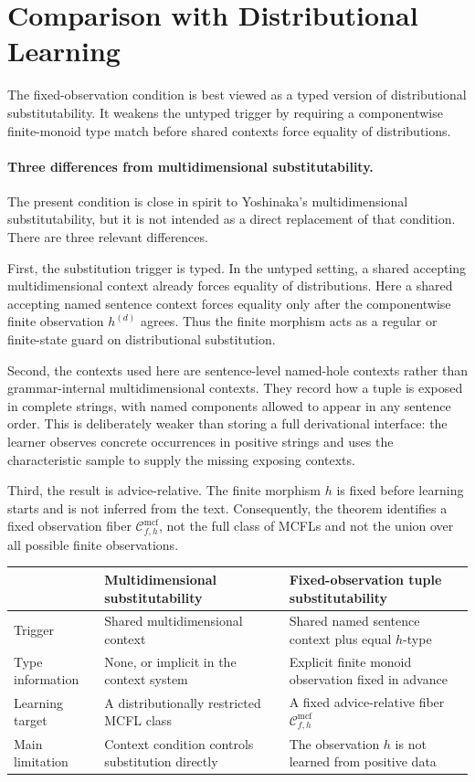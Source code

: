 \documentclass[11pt,a4paper]{article}
\theoremstyle{remark}
\newcommand{\Cmcf}[2]{\mathcal{C}^{\mathrm{mcf}}_{#1,#2}}
\begin{document}
\section{Comparison with Distributional Learning}
\label{sec:comparison}

The fixed-observation condition is best viewed as a typed version of
distributional substitutability.  It weakens the untyped trigger by requiring a
componentwise finite-monoid type match before shared contexts force equality of
distributions.

\paragraph{Three differences from multidimensional substitutability.}
The present condition is close in spirit to Yoshinaka's multidimensional
substitutability, but it is not intended as a direct replacement of that
condition.  There are three relevant differences.

First, the substitution trigger is typed.  In the untyped setting, a shared
accepting multidimensional context already forces equality of distributions.
Here a shared accepting named sentence context forces equality only after the
componentwise finite observation \(h^{(d)}\) agrees.  Thus the finite morphism
acts as a regular or finite-state guard on distributional substitution.

Second, the contexts used here are sentence-level named-hole contexts rather
than grammar-internal multidimensional contexts.  They record how a tuple is
exposed in complete strings, with named components allowed to appear in any
sentence order.  This is deliberately weaker than storing a full derivational
interface: the learner observes concrete occurrences in positive strings and
uses the characteristic sample to supply the missing exposing contexts.

Third, the result is advice-relative.  The finite morphism \(h\) is fixed before
learning starts and is not inferred from the text.  Consequently, the theorem
identifies a fixed observation fiber \(\Cmcf{f}{h}\), not the full class of
MCFLs and not the union over all possible finite observations.

\begin{center}
\begin{tabular}{|p{}|p{}|p{}|}
\hline
 & Multidimensional substitutability & Fixed-observation tuple substitutability \\
\hline
Trigger & Shared multidimensional context & Shared named sentence context plus equal \(h\)-type \\
\hline
Type information & None, or implicit in the context system & Explicit finite monoid observation fixed in advance \\
\hline
Learning target & A distributionally restricted MCFL class & A fixed advice-relative fiber \(\Cmcf{f}{h}\) \\
\hline
Main limitation & Context condition controls substitution directly & The observation \(h\) is not learned from positive data \\
\hline
\end{tabular}
\end{center}
\end{document}
